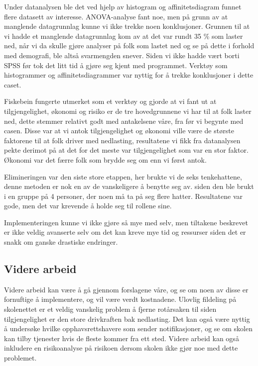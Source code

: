 Under datanalysen ble det ved hjelp av histogram og affinitetsdiagram funnet flere datasett av interesse. ANOVA-analyse fant noe, men på grunn av at manglende datagrunnlag kunne vi ikke trekke noen konklusjoner. Grunnen til at vi hadde et manglende datagrunnlag kom av at det var rundt 35 \% som laster ned, når vi da skulle gjøre analyser på folk som lastet ned og se på dette i forhold med demografi, ble altså svarmengden snever. Siden vi ikke hadde vært borti SPSS før tok det litt tid å gjøre seg kjent med programmet. Verktøy som histogrammer og affinitetsdiagrammer var nyttig for å trekke konklusjoner i dette caset.

Fiskebein fungerte utmerket som et verktøy og gjorde at vi fant ut at tilgjengelighet, økonomi og risiko er de tre hovedgrunnene vi har til at folk laster ned, dette stemmer relativt godt med antakelsene våre, fra før vi begynte med casen. Disse var at vi antok tilgjengelighet og økonomi ville være de største faktorene til at folk driver med nedlasting, resultatene vi fikk fra datanalysen pekte derimot på at det for det meste var tilgjengelighet som var en stor faktor. Økonomi var det færre folk som brydde seg om enn vi først antok. 

Elimineringen var den siste store etappen, her brukte vi de seks tenkehattene, denne metoden er nok en av de vanskeligere å benytte seg av. siden den ble brukt i en gruppe på 4 personer, der noen må ta på seg flere hatter. Resultatene var gode, men det var krevende å holde seg til rollene sine. 

Implementeringen kunne vi ikke gjøre så mye med selv, men tiltakene beskrevet er ikke veldig avanserte selv om det kan kreve mye tid og ressurser siden det er snakk om ganske drastiske endringer. 

\subsection{Videre arbeid}
Videre arbeid kan være å gå gjennom forslagene våre, og se om noen av disse er fornuftige å implementere, og vil være verdt kostnadene. Ulovlig fildeling på skolenettet er et veldig vanskelig problem å fjerne rotårsaken til siden tilgjengelighet er den store drivkraften bak nedlasting. Det kan også være nyttig å undersøke hvilke opphavsrettshavere som sender notifikasjoner, og se om skolen kan tilby tjenester hvis de fleste kommer fra ett sted. Videre arbeid kan også inkludere en risikoanalyse på risikoen dersom skolen ikke gjør noe med dette problemet.

